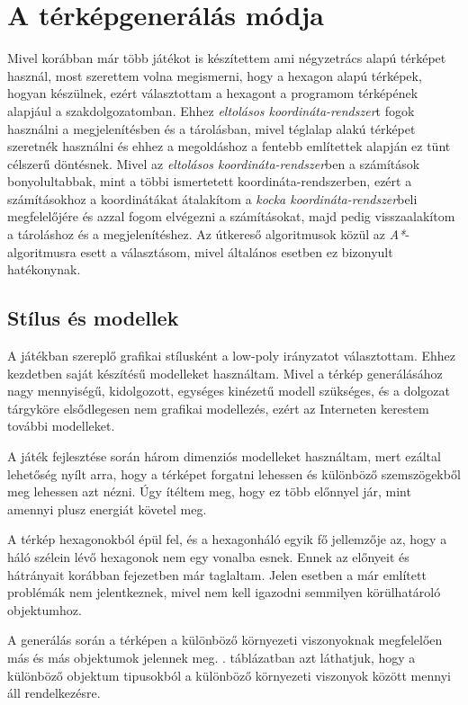 \chapter{A térképgenerálás módja}
\label{chap:tervezes}

Mivel korábban már több játékot is készítettem ami négyzetrács alapú térképet használ, most szerettem volna megismerni, hogy a hexagon alapú térképek, hogyan készülnek, ezért választottam a hexagont a programom térképének alapjául a szakdolgozatomban. Ehhez \textit{eltolásos koordináta-rendszer}t fogok használni a megjelenítésben és a tárolásban, mivel téglalap alakú térképet szeretnék használni és ehhez a megoldáshoz a fentebb említettek alapján ez tünt célszerű döntésnek. Mivel az \textit{eltolásos koordináta-rendszer}ben a számítások bonyolultabbak, mint a többi ismertetett koordináta-rendszerben, ezért a számításokhoz a koordinátákat átalakítom a \textit{kocka koordináta-rendszer}beli megfelelőjére és azzal fogom elvégezni a számításokat, majd pedig visszaalakítom a tároláshoz és a megjelenítéshez. Az útkereső algoritmusok közül az \textit{A*}-algoritmusra esett a választásom, mivel általános esetben ez bizonyult hatékonynak.

\section{Stílus és modellek}

A játékban szereplő grafikai stílusként a low-poly irányzatot választottam. Ehhez kezdetben saját készítésű modelleket használtam. Mivel a térkép generálásához nagy mennyiségű, kidolgozott, egységes kinézetű modell szükséges, és a dolgozat tárgyköre elsődlegesen nem grafikai modellezés, ezért az Interneten kerestem további modelleket.

A játék fejlesztése során három dimenziós modelleket használtam, mert ezáltal lehetőség nyílt arra, hogy a térképet forgatni lehessen és különböző szemszögekből meg lehessen azt nézni. Úgy ítéltem meg, hogy ez több előnnyel jár, mint amennyi plusz energiát követel meg.

A térkép hexagonokból épül fel, és a hexagonháló egyik fő jellemzője az, hogy a háló szélein lévő hexagonok nem egy vonalba esnek. Ennek az előnyeit és hátrányait korábban  fejezetben már taglaltam. Jelen esetben a már említett problémák nem jelentkeznek, mivel nem kell igazodni semmilyen körülhatároló objektumhoz.

A generálás során a térképen a különböző környezeti viszonyoknak megfelelően más és más objektumok jelennek meg. . táblázatban azt láthatjuk, hogy a különböző objektum tipusokból a különböző környezeti viszonyok között mennyi áll rendelkezésre.


